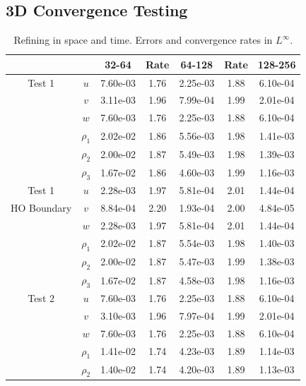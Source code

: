 \documentclass[final]{siamltex}
\begin{document}
\subsection{3D Convergence Testing}

\begin{table}[h]
\begin{center}
\caption{Refining in space and time.  Errors and convergence rates in $L^\infty$.}
\label{tab:Linf_3d}
\begin{tabular}{ccccccc}
& & 32-64 & Rate & 64-128 & Rate & 128-256 \\
\hline
Test 1              & $u$      & 7.60e-03 & 1.76 & 2.25e-03 & 1.88 & 6.10e-04 \\
                    & $v$      & 3.11e-03 & 1.96 & 7.99e-04 & 1.99 & 2.01e-04 \\
                    & $w$      & 7.60e-03 & 1.76 & 2.25e-03 & 1.88 & 6.10e-04 \\
                    & $\rho_1$ & 2.02e-02 & 1.86 & 5.56e-03 & 1.98 & 1.41e-03 \\
                    & $\rho_2$ & 2.00e-02 & 1.87 & 5.49e-03 & 1.98 & 1.39e-03 \\
                    & $\rho_3$ & 1.67e-02 & 1.86 & 4.60e-03 & 1.99 & 1.16e-03 \\
\hline
Test 1              & $u$      & 2.28e-03 & 1.97 & 5.81e-04 & 2.01 & 1.44e-04 \\
HO Boundary         & $v$      & 8.84e-04 & 2.20 & 1.93e-04 & 2.00 & 4.84e-05 \\
                    & $w$      & 2.28e-03 & 1.97 & 5.81e-04 & 2.01 & 1.44e-04 \\
                    & $\rho_1$ & 2.02e-02 & 1.87 & 5.54e-03 & 1.98 & 1.40e-03 \\
                    & $\rho_2$ & 2.00e-02 & 1.87 & 5.47e-03 & 1.99 & 1.38e-03 \\
                    & $\rho_3$ & 1.67e-02 & 1.87 & 4.58e-03 & 1.98 & 1.16e-03 \\
\hline
Test 2              & $u$      & 7.60e-03 & 1.76 & 2.25e-03 & 1.88 & 6.10e-04 \\
                    & $v$      & 3.10e-03 & 1.96 & 7.97e-04 & 1.99 & 2.01e-04 \\
                    & $w$      & 7.60e-03 & 1.76 & 2.25e-03 & 1.88 & 6.10e-04 \\
                    & $\rho_1$ & 1.41e-02 & 1.74 & 4.23e-03 & 1.89 & 1.14e-03 \\
                    & $\rho_2$ & 1.40e-02 & 1.74 & 4.20e-03 & 1.89 & 1.13e-03 \\

\end{tabular}
\end{center}
\end{table}
\end{document}
